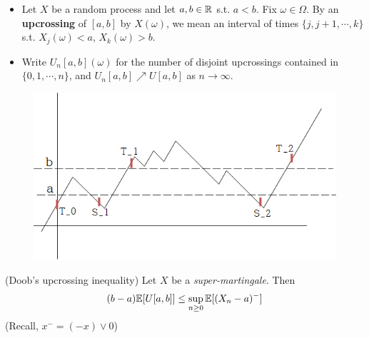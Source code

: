 \documentclass[12pt,a4paper]{report}
\begin{document}
\begin{itemize}
\item Let $X$ be a random process and let $a,b\in \mathbb{R}$ s.t. $a<b$. Fix $\omega \in \Omega$. By an \textbf{upcrossing} of $[a,b]$ by $X(\omega)$, we mean an interval of times $\{j,j+1, \cdots, k\}$ s.t. $X_j(\omega) <a$, $X_k(\omega) >b$.

\item Write $U_n[a,b](\omega)$ for the number of disjoint upcrossings contained in $\{0,1,\cdots,n\}$, and $U_n[a,b] \nearrow U[a,b]$ as $n\rightarrow \infty$.
\end{itemize}
\s


\begin{figure}[h]
	\centering
		\includegraphics[scale=0.5]{upcrossing}
	\centering
\end{figure}


(Doob's upcrossing inequality) Let $X$ be a \emph{super-martingale}. Then
\begin{align*}
(b-a) \mathbb{E}[U[a,b]] \leq \sup_{n\geq 0} \mathbb{E}[(X_n-a)^{-}]
\end{align*}
(Recall, $x^- = (-x) \vee 0$)
\s
\end{document}
